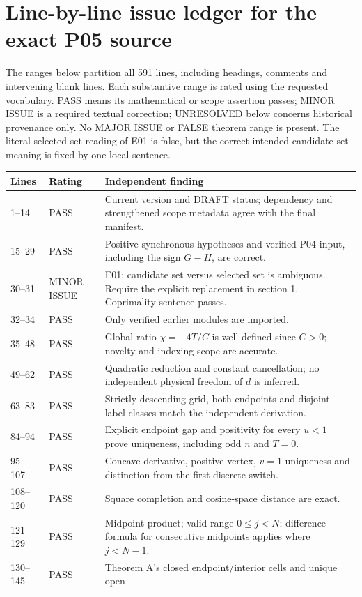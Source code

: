 \documentclass[11pt]{article}
\begin{document}
\section{Line-by-line issue ledger for the exact P05 source}
The ranges below partition all 591 lines, including headings, comments
and intervening blank lines. Each substantive range is rated using the
requested vocabulary. PASS means its mathematical or scope assertion
passes; MINOR ISSUE is a required textual correction; UNRESOLVED below
concerns historical provenance only. No MAJOR ISSUE or FALSE theorem
range is present. The literal selected-set reading of E01 is false, but
the correct intended candidate-set meaning is fixed by one local sentence.
\begin{longtable}{@{}L{0.11\textwidth}L{0.18\textwidth}L{0.65\textwidth}@{}}
\toprule Lines&Rating&Independent finding\\\midrule{}--14&PASS&Current version and DRAFT status; dependency and strengthened scope
metadata agree with the final manifest.\\
15--29&PASS&Positive synchronous hypotheses and verified P04 input, including
the sign $G-H$, are correct.\\
30--31&MINOR ISSUE&E01: candidate set versus selected set is ambiguous.
Require the explicit replacement in section 1. Coprimality sentence passes.\\
32--34&PASS&Only verified earlier modules are imported.\\
35--48&PASS&Global ratio $\chi=-4T/C$ is well defined since $C>0$;
novelty and indexing scope are accurate.\\
49--62&PASS&Quadratic reduction and constant cancellation; no independent
physical freedom of $d$ is inferred.\\
63--83&PASS&Strictly descending grid, both endpoints and disjoint label
classes match the independent derivation.\\
84--94&PASS&Explicit endpoint gap and positivity for every $u<1$ prove
uniqueness, including odd $n$ and $T=0$.\\
95--107&PASS&Concave derivative, positive vertex, $v=1$ uniqueness and
distinction from the first discrete switch.\\
108--120&PASS&Square completion and cosine-space distance are exact.\\
121--129&PASS&Midpoint product; valid range $0\le j<N$; difference formula
for consecutive midpoints applies where $j<N-1$.\\
130--145&PASS&Theorem A's closed endpoint/interior cells and unique open

\end{longtable}
\end{document}
